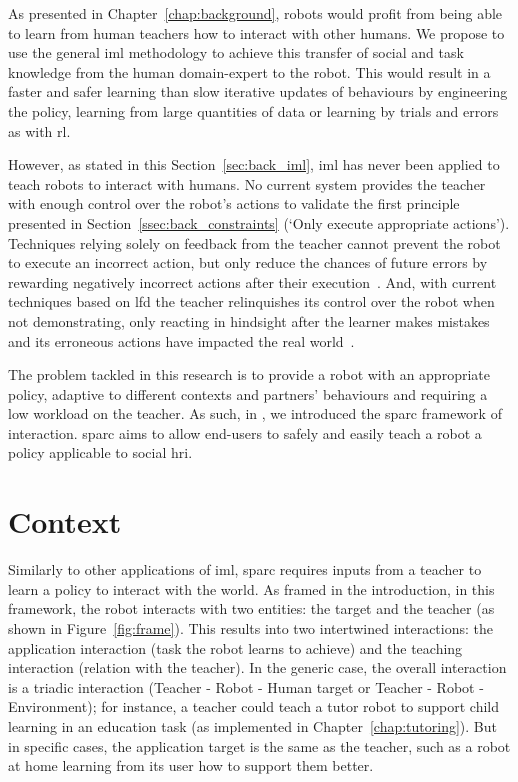 As presented in Chapter~\ref{chap:background}, robots would profit from being able to learn from human teachers how to interact with other humans. We propose to use the general \gls{iml} methodology to achieve this transfer of social and task knowledge from the human domain-expert to the robot. This would result in a faster and safer learning than slow iterative updates of behaviours by engineering the policy, learning from large quantities of data or learning by trials and errors as with \gls{rl}.

However, as stated in this Section~\ref{sec:back_iml}, \gls{iml} has never been applied to teach robots to interact with humans. No current system provides the teacher with enough control over the robot's actions to validate the first principle presented in Section~\ref{ssec:back_constraints} (`Only execute appropriate actions'). Techniques relying solely on feedback from the teacher cannot prevent the robot to execute an incorrect action, but only reduce the chances of future errors by rewarding negatively incorrect actions after their execution~\citep{senft2017supervised}. And, with current techniques based on \gls{lfd} the teacher relinquishes its control over the robot when not demonstrating, only reacting in hindsight after the learner makes mistakes and its erroneous actions have impacted the real world~\citep{chernova2009interactive}.

The problem tackled in this research is to provide a robot with an appropriate policy, adaptive to different contexts and partners' behaviours and requiring a low workload on the teacher. As such, in \cite{senft2015sparc}, we introduced the \gls{sparc} framework of interaction. \gls{sparc} aims to allow end-users to safely and easily teach a robot a policy applicable to social \gls{hri}.

\section{Context}

Similarly to other applications of \gls{iml}, \gls{sparc} requires inputs from a teacher to learn a policy to interact with the world. As framed in the introduction, in this framework, the robot interacts with two entities: the target and the teacher (as shown in Figure~\ref{fig:frame}). This results into two intertwined interactions: the application interaction (task the robot learns to achieve) and the teaching interaction (relation with the teacher). In the generic case, the overall interaction is a triadic interaction (Teacher - Robot - Human target or Teacher - Robot - Environment); for instance, a teacher could teach a tutor robot to support child learning in an education task (as implemented in Chapter~\ref{chap:tutoring}). But in specific cases, the application target is the same as the teacher, such as a robot at home learning from its user how to support them better.

